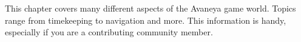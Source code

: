 

This chapter covers many different aspects of the Avaneya game world. Topics range from timekeeping to navigation and more. This information is handy, especially if you are a contributing community member.


%
%
%
%
%
%
%
%
%
%
%
%
%

%

\StopChapter

